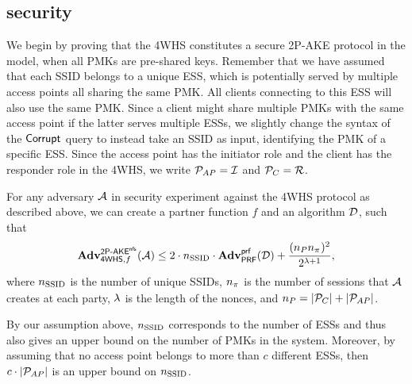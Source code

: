 \subsection{\texorpdfstring{\akenfstext }{AKEnfs} security}\label{sec:802.11:4WHS:AKE}
We begin by proving that the 4WHS constitutes a secure 2P-AKE protocol in the \akenfstext  model,
when all PMKs are pre-shared keys. 
Remember that we have assumed that each SSID belongs to a unique ESS,
which is potentially served by multiple access points all sharing the same PMK. 
All clients connecting to this ESS will also use the same PMK.
Since a client might share multiple PMKs with the same access point if the latter serves multiple ESSs,
we slightly change the syntax of the $\Corrupt$ query  to instead take an SSID as input,
identifying the PMK of a specific ESS.
Since the access point has the initiator role and the client has the responder role in the 4WHS,
we write $\Parties_{AP} = \Inits$ and $\Parties_{C} = \Responders$.



\begin{theorem}\label{thm:4WHS:2P-AKE}
For any adversary $\A$ in security experiment \akenfstext against the 4WHS protocol as described above,
we can create a partner function $f$ and an algorithm $\A[D]$, such that
\begin{equation}
	\adv_{\mathsf{4WHS},f}^{\operatorname{\mathsf{2P-\akenfs}}}(\A)  
	\leq 2 \cdot \numssid  \cdot \adv_{\mathsf{PRF}}^{\prf}(\A[D]) 
	+\frac{(\numparties  \numsessions)^2}{2^{\noncelen+1}} ,
\end{equation}
where $\numssid$ is the number of unique SSIDs, 
$\numsessions$ is the number of sessions that $\A$ creates at each party,
$\noncelen$ is the length of the nonces,
and $\numparties = |\mathcal{P}_C | + |\mathcal{P}_{AP}|$.	
\end{theorem}


By our assumption above,
$\numssid$ corresponds to the number of ESSs and thus also gives an upper bound on the number of PMKs in the system.
Moreover,
by assuming that no access point belongs to more than $c$ different ESSs,
then $c \cdot | \Parties_{AP} |$ is an upper bound on $\numssid$.



